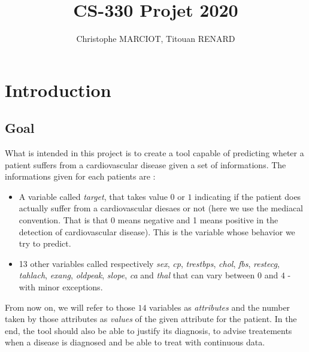 \documentclass[french]{article}
\title{CS-330 Projet 2020}   %
\author{Christophe MARCIOT, Titouan RENARD}         %
\begin{document}
\maketitle

\section{Introduction}

\subsection{Goal}

What is intended in this project is to create a tool capable of predicting wheter a patient suffers from a cardiovascular disease given a set of informations.
The informations given for each patients are :
	\begin{itemize}
		\item A variable called \emph{target}, that takes value $0$ or $1$ indicating if the patient does actually suffer from a cardiovascular diesaes or not (here we use the mediacal convention. That is that 0 means negative and 1 means positive in the detection of cardiovascular disease). This is the variable whose behavior we try to predict.
		\item 13 other variables called respectively \emph{sex}, \emph{cp}, \emph{trestbps}, \emph{chol}, \emph{fbs}, \emph{restecg}, \emph{tahlach}, \emph {exang}, \emph{oldpeak}, \emph{slope}, \emph{ca} and \emph{thal} that can vary between $0$ and $4$ - with minor exceptions.
	\end{itemize}
From now on, we will refer to those $14$  variables as \emph{attributes} and the number taken by those attributes as \emph{values} of the given attribute for the patient. In the end, the tool should also be able to justify its diagnosis, to advise treatements when a disease is diagnosed and be able to treat with continuous data.
\end{document}

